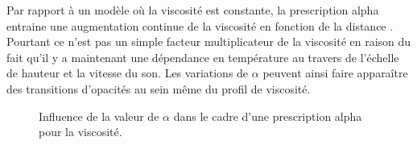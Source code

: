 Par rapport à un modèle où la viscosité est constante, la prescription alpha entraine une augmentation continue de la viscosité en fonction de la distance . Pourtant ce n'est pas un simple facteur multiplicateur de la viscosité en raison du fait qu'il y a maintenant une dépendance en température au travers de l'échelle de hauteur et la vitesse du son. Les variations de $\alpha$ peuvent ainsi faire apparaître des transitions d'opacités au sein même du profil de viscosité. 

\begin{figure}[htbp]
\centering
{}
\hfill
{}

\hfill
{}
\caption{Influence de la valeur de $\alpha$ dans le cadre d'une prescription alpha pour la viscosité. }\label{fig:alpha_viscosity}
\end{figure}

